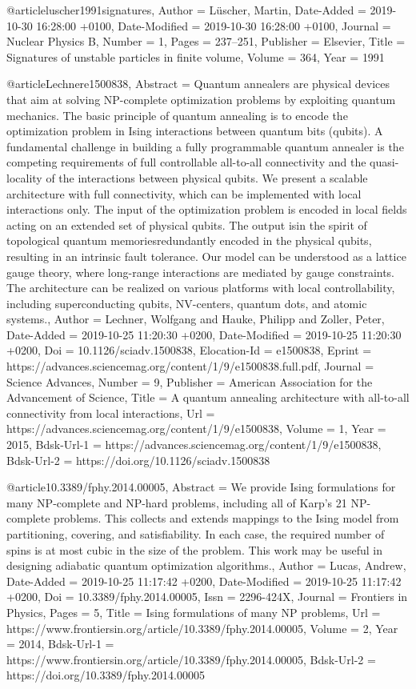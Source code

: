 \documentclass[epj,final]{svjour}
\begin{document}
@article{luscher1991signatures,
	Author = {L{\"u}scher, Martin},
	Date-Added = {2019-10-30 16:28:00 +0100},
	Date-Modified = {2019-10-30 16:28:00 +0100},
	Journal = {Nuclear Physics B},
	Number = {1},
	Pages = {237--251},
	Publisher = {Elsevier},
	Title = {Signatures of unstable particles in finite volume},
	Volume = {364},
	Year = {1991}}

@article{Lechnere1500838,
	Abstract = {Quantum annealers are physical devices that aim at solving NP-complete optimization problems by exploiting quantum mechanics. The basic principle of quantum annealing is to encode the optimization problem in Ising interactions between quantum bits (qubits). A fundamental challenge in building a fully programmable quantum annealer is the competing requirements of full controllable all-to-all connectivity and the quasi-locality of the interactions between physical qubits. We present a scalable architecture with full connectivity, which can be implemented with local interactions only. The input of the optimization problem is encoded in local fields acting on an extended set of physical qubits. The output is{\textemdash}in the spirit of topological quantum memories{\textemdash}redundantly encoded in the physical qubits, resulting in an intrinsic fault tolerance. Our model can be understood as a lattice gauge theory, where long-range interactions are mediated by gauge constraints. The architecture can be realized on various platforms with local controllability, including superconducting qubits, NV-centers, quantum dots, and atomic systems.},
	Author = {Lechner, Wolfgang and Hauke, Philipp and Zoller, Peter},
	Date-Added = {2019-10-25 11:20:30 +0200},
	Date-Modified = {2019-10-25 11:20:30 +0200},
	Doi = {10.1126/sciadv.1500838},
	Elocation-Id = {e1500838},
	Eprint = {https://advances.sciencemag.org/content/1/9/e1500838.full.pdf},
	Journal = {Science Advances},
	Number = {9},
	Publisher = {American Association for the Advancement of Science},
	Title = {A quantum annealing architecture with all-to-all connectivity from local interactions},
	Url = {https://advances.sciencemag.org/content/1/9/e1500838},
	Volume = {1},
	Year = {2015},
	Bdsk-Url-1 = {https://advances.sciencemag.org/content/1/9/e1500838},
	Bdsk-Url-2 = {https://doi.org/10.1126/sciadv.1500838}}

@article{10.3389/fphy.2014.00005,
	Abstract = {We provide Ising formulations for many NP-complete and NP-hard problems, including all of Karp's 21 NP-complete problems. This collects and extends mappings to the Ising model from partitioning, covering, and satisfiability. In each case, the required number of spins is at most cubic in the size of the problem. This work may be useful in designing adiabatic quantum optimization algorithms.},
	Author = {Lucas, Andrew},
	Date-Added = {2019-10-25 11:17:42 +0200},
	Date-Modified = {2019-10-25 11:17:42 +0200},
	Doi = {10.3389/fphy.2014.00005},
	Issn = {2296-424X},
	Journal = {Frontiers in Physics},
	Pages = {5},
	Title = {Ising formulations of many NP problems},
	Url = {https://www.frontiersin.org/article/10.3389/fphy.2014.00005},
	Volume = {2},
	Year = {2014},
	Bdsk-Url-1 = {https://www.frontiersin.org/article/10.3389/fphy.2014.00005},
	Bdsk-Url-2 = {https://doi.org/10.3389/fphy.2014.00005}}
\end{document}
